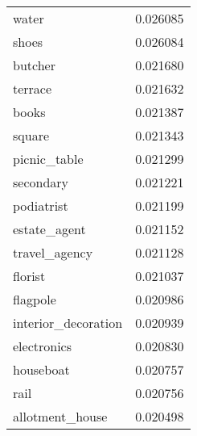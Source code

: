 \begin{tabular}{lr}
water & 0.026085 \\
shoes & 0.026084 \\
butcher & 0.021680 \\
terrace & 0.021632 \\
books & 0.021387 \\
square & 0.021343 \\
picnic_table & 0.021299 \\
secondary & 0.021221 \\
podiatrist & 0.021199 \\
estate_agent & 0.021152 \\
travel_agency & 0.021128 \\
florist & 0.021037 \\
flagpole & 0.020986 \\
interior_decoration & 0.020939 \\
electronics & 0.020830 \\
houseboat & 0.020757 \\
rail & 0.020756 \\
allotment_house & 0.020498 \\
\bottomrule
\end{tabular}
